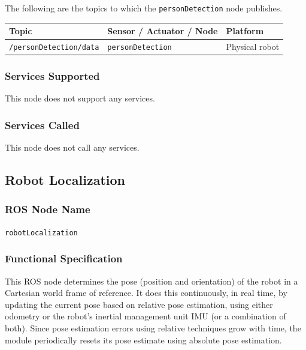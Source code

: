 \documentclass{CSSRforAfrica}
\begin{document}
{{The following are the topics to which the {\small \verb+personDetection+} node publishes.
 
\begin{center}
\begin{tabularx}{\linewidth}{| l | l | X|}
\hline 
{\small Topic }                                                                                & {\small Sensor / Actuator / Node}    &  {\small Platform}       \\
\hline
{\footnotesize \verb+/personDetection/data+ }  & {\footnotesize \texttt{personDetection}} & {\small Physical robot} \\ 
\hline
\end{tabularx}
\end{center}

\newpage

\subsubsection*{Services Supported}
This node  does not support any services.

\subsubsection*{Services Called}
This node does not call any services.







\newpage

\subsection{Robot Localization }

\subsubsection*{ROS Node Name}
 {\small \verb+robotLocalization+}   

\subsubsection*{Functional Specification}
This ROS node  determines the pose (position and orientation) of the robot in a Cartesian world frame of reference.     
It does this continuously, in real time, by updating the current pose based on relative pose estimation, using either odometry or the robot's inertial management unit IMU (or a combination of both).  Since pose estimation errors using relative techniques  grow with time, the module periodically  resets its pose estimate using absolute pose estimation.  

}}
\end{document}
